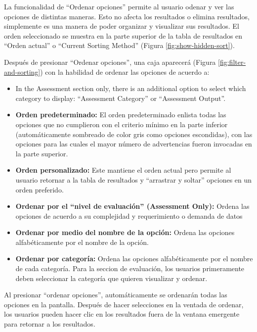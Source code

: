 \documentclass[
  11pt,
]{book}
\providecommand{\tightlist}{%
  \setlength{\itemsep}{0pt}\setlength{\parskip}{0pt}}
\begin{document}
La funcionalidad de ``Ordenar opciones'' permite al usuario odenar y ver las opciones de distintas maneras. Esto no afecta los resultados o elimina resultados, simplemente es una manera de poder organizar y visualizar sus resultados. El orden seleccionado se muestra en la parte superior de la tabla de resultados en ``Orden actual'' o ``Current Sorting Method'' (Figura \ref{fig:show-hidden-sort}).

Después de presionar ``Ordenar opciones'', una caja aparecerá (Figura \ref{fig:filter-and-sorting}) con la habilidad de ordenar las opciones de acuerdo a:

\begin{itemize}
\tightlist
\item
  In the Assessment section only, there is an additional option to select which category to display: ``Assessment Category'' or ``Assessment Output''.
\item
  \textbf{Orden predeterminado:} El orden predeterminado enlista todas las opciones que no cumplieron con el criterio mínimo en la parte inferior (automáticamente sombreado de color gris como opciones escondidas), con las opciones para las cuales el mayor número de advertencias fueron invocadas en la parte superior.
\item
  \textbf{Orden personalizado:} Este mantiene el orden actual pero permite al usuario retornar a la tabla de resultados y ``arrastrar y soltar'' opciones en un orden preferido.
\item
  \textbf{Ordenar por el ``nivel de evaluación'' (Assessment Only):} Ordena las opciones de acuerdo a su complejidad y requerimiento o demanda de datos
\item
  \textbf{Ordenar por medio del nombre de la opción:} Ordena las opciones alfabéticamente por el nombre de la opción.
\item
  \textbf{Ordenar por categoría:} Ordena las opciones alfabéticamente por el nombre de cada categoría. Para la seccion de evaluación, los usuarios primeramente deben seleccionar la categoría que quieren visualizar y ordenar.
\end{itemize}

Al presionar ``ordenar opciones'', automáticamente se ordenarán todas las opciones en la pantalla. Después de hacer selecciones en la ventada de ordenar, los usuarios pueden hacer clic en los resultados fuera de la ventana emergente para retornar a los resultados.
\end{document}
